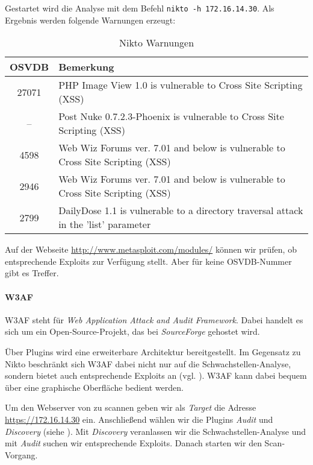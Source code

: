 Gestartet wird die Analyse mit dem Befehl \texttt{nikto -h 172.16.14.30}. Als
Ergebnis werden folgende Warnungen erzeugt:

\begin{table}[H]
\caption{Nikto Warnungen}
\label{NiktoResult}
\centering
\begin{tabular}{cp{9cm}}
\toprule
OSVDB\footnotemark & Bemerkung\\
\midrule
27071 & PHP Image View 1.0 is vulnerable to Cross Site Scripting (XSS)\\
-- & Post Nuke 0.7.2.3-Phoenix is vulnerable to Cross Site Scripting (XSS) \\
4598 & Web Wiz Forums ver. 7.01 and below is vulnerable to Cross Site Scripting (XSS)\\
2946 & Web Wiz Forums ver. 7.01 and below is vulnerable to Cross Site Scripting (XSS)\\
2799 & DailyDose 1.1 is vulnerable to a directory traversal attack in the 'list' parameter\\
\bottomrule
\end{tabular}
\end{table}


Auf der Webseite \url{http://www.metasploit.com/modules/} können wir prüfen, ob
\Metasploit{} entsprechende Exploits zur Verfügung stellt. Aber für keine
OSVDB-Nummer gibt es Treffer.
    
\paragraph{W3AF}

W3AF steht für \emph{Web Application Attack and Audit Framework}. Dabei handelt
es sich um ein Open-Source-Projekt, das bei \emph{SourceForge} gehostet wird.

Über Plugins wird eine erweiterbare Architektur bereitgestellt. Im Gegensatz zu
Nikto beschränkt sich W3AF dabei nicht nur auf die Schwachstellen-Analyse,
sondern bietet auch entsprechende Exploits an (vgl. \cite{W3AF}). W3AF kann
dabei bequem über eine graphische Oberfläche bedient werden.

Um den Webserver von \Mayerbrot{} zu scannen geben wir als \emph{Target} die
Adresse \url{https://172.16.14.30} ein. Anschließend wählen wir die Plugins
\emph{Audit} und \emph{Discovery} (siehe ). Mit \emph{Discovery}
veranlassen wir die Schwachstellen-Analyse und mit \emph{Audit} suchen wir
entsprechende Exploits. Danach starten wir den Scan-Vorgang.

